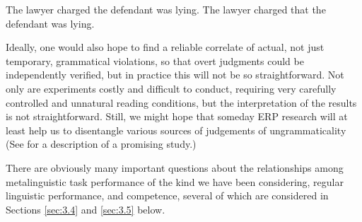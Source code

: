 \ea\label{ex:3:2}
\ea The lawyer charged the defendant was lying.
\ex The lawyer charged that the defendant was lying.
\z
\z

\noindent
Ideally, one would also hope to find a reliable  correlate of actual, not just temporary, grammatical violations, so that overt judgments could be independently verified, but in practice this will not be so straightforward. Not only are  experiments costly and difficult to conduct, requiring very carefully controlled and unnatural reading conditions, but the interpretation of the results is not straightforward.  Still, we  might  hope  that  someday  ERP research  will  at least
help us to disentangle various sources of judgements of ungrammaticality (See  for a description of a promising study.)

There are obviously many important questions about the relationships among metalinguistic task performance of the kind we have been considering, regular linguistic performance, and competence, several of which are considered in Sections \ref{sec:3.4} and \ref{sec:3.5} below.
